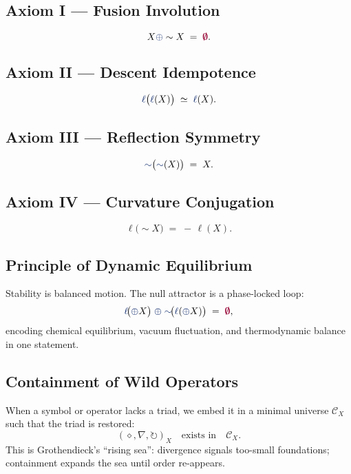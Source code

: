 \subsection{Axiom I — Fusion Involution}
\[
X \fuse \sim X \;=\; \void.
\]

\subsection{Axiom II — Descent Idempotence}
\[
\lha\bigl(\lha(X)\bigr) \;\simeq\; \lha(X).
\]

\subsection{Axiom III — Reflection Symmetry}
\[
\reflec\bigl(\reflec(X)\bigr) \;=\; X.
\]

\subsection{Axiom IV — Curvature Conjugation}
\[
\ell\!\bigl(\sim X\bigr) \;=\; -\,\ell(X).
\]

\subsection{Principle of Dynamic Equilibrium}

Stability is balanced motion.  The null attractor is a phase-locked loop:
\[
\lha\!\bigl(\fuse X\bigr)
   \;\fuse\;
\reflec\!\bigl(\lha(\fuse X)\bigr)
   \;=\;
\void,
\]
encoding chemical equilibrium, vacuum fluctuation, and thermodynamic balance
in one statement.

\subsection{Containment of Wild Operators}

When a symbol or operator lacks a triad, we embed it in a minimal universe
$\mathcal{C}_X$ such that the triad is restored:
\[
(\diamond,\nabla,\circlearrowright)_{X}
\quad\text{exists in}\quad
\mathcal{C}_X.
\]
This is Grothendieck’s ``rising sea'': divergence signals too-small
foundations; containment expands the sea until order re-appears.

